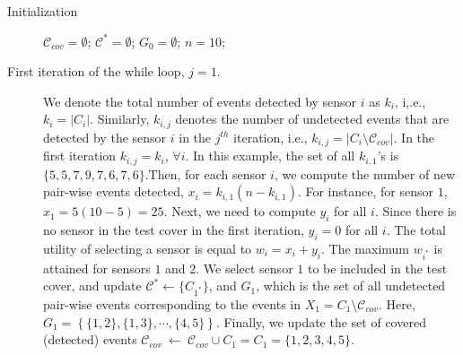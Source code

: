 \documentclass[twocolumn]{autart}
\begin{document}
\begin{description}
\item[Initialization] $\mathcal{C}_{cov} = \emptyset$; $\mathcal{C}^{{\ast}}=\emptyset $; $G_0=\emptyset$; $n = 10$;
\item[First iteration of the while loop, $j=1$.] We denote the total number of events detected by sensor $i$ as $k_i$, i,.e., $k_i = |C_i|$. Similarly, $k_{i,j}$ denotes the number of undetected events that are detected by the sensor $i$ in the $j^{th}$ iteration, i.e., $k_{i,j} = |C_i\setminus \mathcal{C}_{cov}|$. In the first iteration $k_{i,j} = k_i$, $\forall i$. In this example, the set of all $k_{i,1}$'s is $\{5,5,7,9,7,6,7,6\}$.Then, for each sensor $i$, we compute the number of new pair-wise events detected, $x_i = k_{i,1}(n - k_{i,1})$. For instance, for sensor $1$, $x_1=5(10-5)=25$. Next, we need to compute $y_i$ for all $i$. Since there is no sensor in the test cover in the first iteration, $y_i=0$ for all $i$. The total utility of selecting a sensor is equal to $w_i = x_i + y_i$. The maximum $w_{i^\ast}$ is attained for sensors $1$ and $2$. We select sensor $1$ to be included in the test cover, and update $\mathcal{C}^{{\ast}}\gets \{C_{1^{\ast}}\}$, and $G_1$, which is the set of all undetected pair-wise events corresponding to the events in $X_1 = C_1\setminus \mathcal{C}_{cov}$. Here, $G_1 =  \left\{\{1,2\},\{1,3\},\cdots,\{4,5\} \right\}$. Finally, we update the set of covered (detected) events $\mathcal{C}_{cov}~\gets~\mathcal{C}_{cov}\cup C_1 = C_1=\{1,2,3,4,5\}$. 


\end{description}
\end{document}
